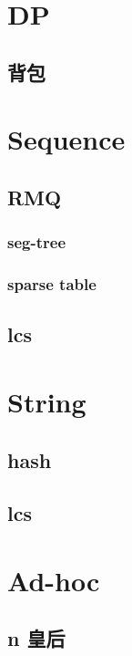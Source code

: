 \section{DP}

\subsection{背包}


\section{Sequence}

\subsection{RMQ}

\subsubsection{seg-tree}


\subsubsection{sparse table}


\subsection{lcs}


\section{String}

\subsection{hash}


\subsection{lcs}


\section{Ad-hoc}

\subsection{n 皇后}
